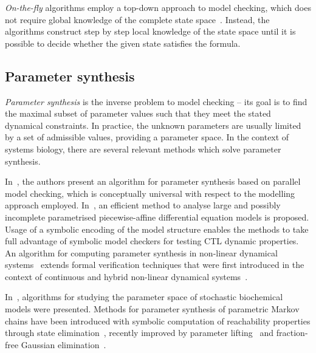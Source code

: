 \documentclass[11pt,a4paper]{report}
\begin{document}
\emph{On-the-fly} algorithms employ a top-down approach to model checking, which does not require global knowledge of the complete state space~\cite{latella2014fly,bhat1995efficient,courcoubetis1992memory,gnesi2011abstract,holzmann2004spin}. Instead, the algorithms construct step by step local knowledge of the state space until it is possible to decide whether the given state satisfies the formula. 

\subsection{Parameter synthesis}\label{synthesis}

\emph{Parameter synthesis} is the inverse problem to model checking -- its goal is to find the maximal subset of parameter values such that they meet the stated dynamical constraints. In practice, the unknown parameters are usually limited by a set of admissible values, providing a parameter space. In the context of systems biology, there are several relevant methods which solve parameter synthesis. 

In~\cite{barnat2011parameter}, the authors present an algorithm for parameter synthesis based on parallel model checking, which is conceptually universal with respect to the modelling approach employed. In~\cite{batt2010efficient}, an efficient method to analyse large and possibly incomplete parametrised piecewise-affine differential equation models is proposed. Usage of a symbolic encoding of the model structure enables the methods to take full advantage of symbolic model checkers for testing CTL dynamic properties. An algorithm for computing parameter synthesis in non-linear dynamical systems~\cite{donze2010parameter} extends formal verification techniques that were first introduced in the context of continuous and hybrid non-linear dynamical systems~\cite{donze2007systematic}.

In~\cite{jha2011synthesis}, algorithms for studying the parameter space of stochastic biochemical models were presented. Methods for parameter synthesis of parametric Markov chains have been introduced with symbolic computation of reachability properties through state elimination~\cite{daws2004symbolic,jansen2014accelerating,hahn2011probabilistic}, recently improved by parameter lifting~\cite{quatmann2016parameter} and fraction-free Gaussian elimination~\cite{hutschenreiter2017parametric}.
\end{document}
